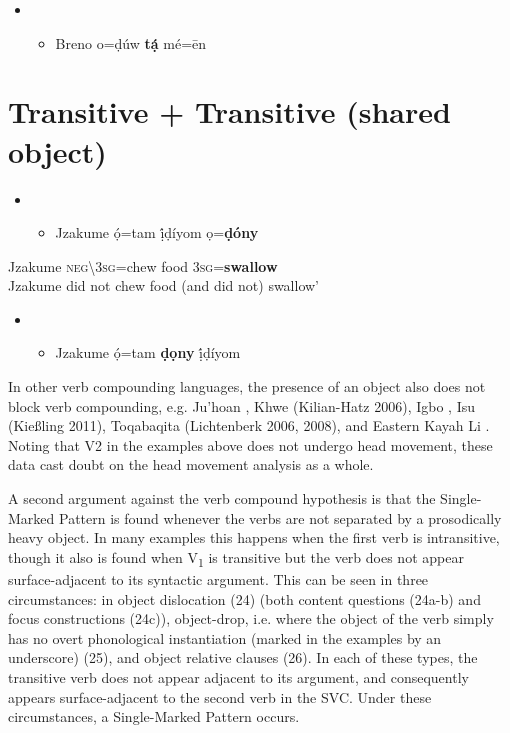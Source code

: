 \begin{itemize}
\item \setcounter{itemize}{0}
\begin{itemize}
\item \gll *Breno o=ḍúw  \textbf{tạ́}  mé=\={e}n\\
\end{itemize}
\end{itemize}
\chapter[Transitive + Transitive (shared object)]{Transitive + Transitive (shared object)}
\label{bkm:Ref419990314}\begin{itemize}
\item \setcounter{itemize}{0}
\begin{itemize}
\item \gll Jzakume   ọ́=tam      ị́ḍíyom  ọ=\textbf{ḍóny}\\
\end{itemize}
\end{itemize}
     Jzakume  \textsc{neg{\textbackslash}}3\textsc{sg}=chew  food  3\textsc{sg}=\textbf{swallow}\\
\glt Jzakume did not chew food (and did not) swallow’ \citep[110]{Kari2004}
\z

\begin{itemize}
\item \setcounter{itemize}{0}
\begin{itemize}
\item \gll *Jzakume  ọ́=tam  \textbf{ḍọny  }ị́ḍíyom\\
\end{itemize}
\end{itemize}

In other verb compounding languages, the presence of an object also does not block verb compounding, e.g. Ju{\textbar}’hoan \citep{Collins2002}, Khwe (Kilian-Hatz 2006), Igbo \citep{Lord1975}, Isu (Kießling 2011), Toqabaqita (Lichtenberk 2006, 2008), and Eastern Kayah Li \citep{Solnit2006}. Noting that V2 in the examples above does not undergo head movement, these data cast doubt on the head movement analysis as a whole.

A second argument against the verb compound hypothesis is that the Single-Marked Pattern is found whenever the verbs are not separated by a prosodically heavy object. In many examples this happens when the first verb is intransitive, though it also is found when V\textsubscript{1} is transitive but the verb does not appear surface-adjacent to its syntactic argument. This can be seen in three circumstances: in object dislocation (24) (both content questions (24a-b) and focus constructions (24c)), object-drop, i.e. where the object of the verb simply has no overt phonological instantiation (marked in the examples by an underscore) (25), and object relative clauses (26). In each of these types, the transitive verb does not appear adjacent to its argument, and consequently appears surface-adjacent to the second verb in the SVC. Under these circumstances, a Single-Marked Pattern occurs.

